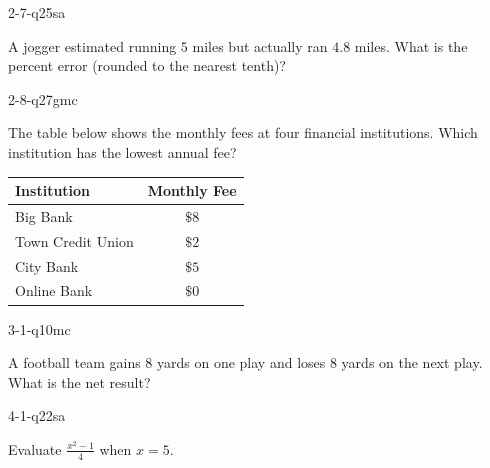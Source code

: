\documentclass[12pt, fleqn, openany]{studyGuide}
\begin{document}
\begin{practiceQuestion}{2-7-q25}{sa}
\begin{questionText}
A jogger estimated running $5$ miles but actually ran $4.8$ miles. What is the percent error (rounded to the nearest tenth)?
\end{questionText}
\end{practiceQuestion}

\begin{practiceQuestion}{2-8-q27}{gmc}
\begin{questionText}
The table below shows the monthly fees at four financial institutions. Which institution has the lowest annual fee?

\begin{center}
\begin{tabular}{|l|c|}
\hline
\textbf{Institution} & \textbf{Monthly Fee} \\
\hline
Big Bank & $\$8$ \\
\hline
Town Credit Union & $\$2$ \\
\hline
City Bank & $\$5$ \\
\hline
Online Bank & $\$0$ \\
\hline
\end{tabular}
\end{center}
\end{questionText}
\end{practiceQuestion}

\begin{practiceQuestion}{3-1-q10}{mc}
\begin{questionText}
A football team gains $8$ yards on one play and loses $8$ yards on the next play. What is the net result?
\end{questionText}
\end{practiceQuestion}

\begin{practiceQuestion}{4-1-q22}{sa}
\begin{questionText}
Evaluate $\frac{x^2 - 1}{4}$ when $x = 5$.
\end{questionText}
\end{practiceQuestion}
\end{document}
